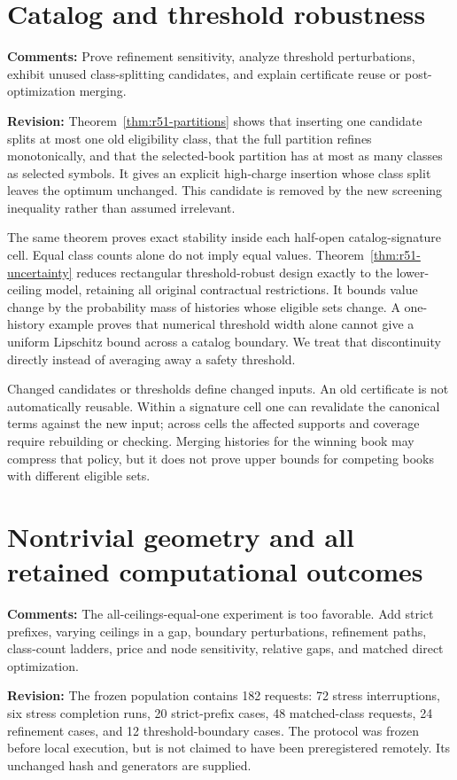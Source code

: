 \documentclass[11pt,letterpaper]{article}
\begin{document}
\section{Catalog and threshold robustness}
\textbf{Comments:} Prove refinement sensitivity, analyze threshold perturbations, exhibit unused class-splitting candidates, and explain certificate reuse or post-optimization merging.

\textbf{Revision:} Theorem~\ref{thm:r51-partitions} shows that inserting one candidate splits at most one old eligibility class, that the full partition refines monotonically, and that the selected-book partition has at most as many classes as selected symbols. It gives an explicit high-charge insertion whose class split leaves the optimum unchanged. This candidate is removed by the new screening inequality rather than assumed irrelevant.

The same theorem proves exact stability inside each half-open catalog-signature cell. Equal class counts alone do not imply equal values. Theorem~\ref{thm:r51-uncertainty} reduces rectangular threshold-robust design exactly to the lower-ceiling model, retaining all original contractual restrictions. It bounds value change by the probability mass of histories whose eligible sets change. A one-history example proves that numerical threshold width alone cannot give a uniform Lipschitz bound across a catalog boundary. We treat that discontinuity directly instead of averaging away a safety threshold.

Changed candidates or thresholds define changed inputs. An old certificate is not automatically reusable. Within a signature cell one can revalidate the canonical terms against the new input; across cells the affected supports and coverage require rebuilding or checking. Merging histories for the winning book may compress that policy, but it does not prove upper bounds for competing books with different eligible sets.

\section{Nontrivial geometry and all retained computational outcomes}
\textbf{Comments:} The all-ceilings-equal-one experiment is too favorable. Add strict prefixes, varying ceilings in a gap, boundary perturbations, refinement paths, class-count ladders, price and node sensitivity, relative gaps, and matched direct optimization.

\textbf{Revision:} The frozen population contains 182 requests: 72 stress interruptions, six stress completion runs, 20 strict-prefix cases, 48 matched-class requests, 24 refinement cases, and 12 threshold-boundary cases. The protocol was frozen before local execution, but is not claimed to have been preregistered remotely. Its unchanged hash and generators are supplied.
\end{document}
